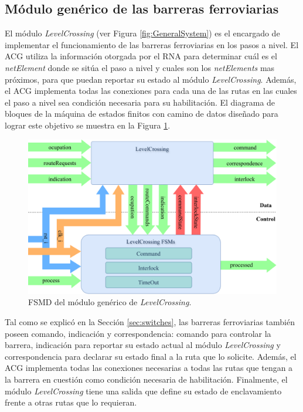 \subsection{Módulo genérico de las barreras ferroviarias}
	\label{sec:ACG_lc}
	
	El módulo \textit{LevelCrossing} (ver Figura \ref{fig:GeneralSystem}) es el encargado de implementar el funcionamiento de las barreras ferroviarias en los pasos a nivel. El ACG utiliza la información otorgada por el RNA para determinar cuál es el \textit{netElement} donde se sitúa el paso a nivel y cuales son los \textit{netElements} mas próximos, para que puedan reportar su estado al módulo \textit{LevelCrossing}. Además, el ACG implementa todas las conexiones para cada una de las rutas en las cuales el paso a nivel sea condición necesaria para su habilitación. El diagrama de bloques de la máquina de estados finitos con camino de datos diseñado para lograr este objetivo se muestra en la Figura \ref{fig:LCB_module}.
	
	\begin{figure}[H]
		\centering
		\includegraphics[width=1\textwidth]{Figuras/LCB_module}
		\centering\caption{FSMD del módulo genérico de \textit{LevelCrossing}.}
		\label{fig:LCB_module}
	\end{figure}
	
	Tal como se explicó en la Sección \ref{sec:switches}, las barreras ferroviarias también poseen comando, indicación y correspondencia: comando para controlar la barrera, indicación para reportar su estado actual al módulo \textit{LevelCrossing} y correspondencia para declarar su estado final a la ruta que lo solicite. Además, el ACG implementa todas las conexiones necesarias a todas las rutas que tengan a la barrera en cuestión como condición necesaria de habilitación. Finalmente, el módulo \textit{LevelCrossing} tiene una salida que define su estado de enclavamiento frente a otras rutas que lo requieran.
	
